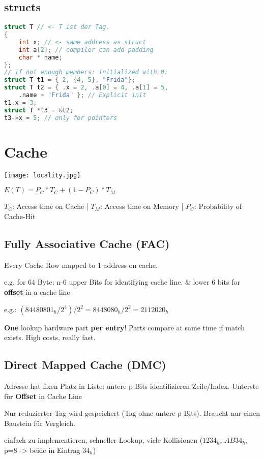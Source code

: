 \begin{multicols*}{4}
\subsection{structs}
\begin{lstlisting}[language=c]
struct T // <- T ist der Tag.
{
    int x; // <- same address as struct
    int a[2]; // compiler can add padding
    char * name;
};
// If not enough members: Initialized with 0:
struct T t1 = { 2, {4, 5}, "Frida"};
struct T t2 = { .x = 2, .a[0] = 4, .a[1] = 5,
    .name = "Frida" }; // Explicit init
t1.x = 3;
struct T *t3 = &t2;
t3->x = 5; // only for pointers
\end{lstlisting}

\section{Cache}
\texttt{[image: locality.jpg]}

\(E(T) = P_C * T_C + (1 - P_C )* T_M\)

\(T_C\): Access time on Cache |
\(T_M\): Access time on Memory |
\(P_C\): Probability of Cache-Hit

\subsection{Fully Associative Cache (FAC)}
Every Cache Row mapped to 1 address on cache.

e.g. for 64 Byte: n-6 upper Bits for identifying cache line. \& lower 6 bits for \textbf{offset} in a cache line

e.g.: \((84480801_h / 2^4) / 2^2 = 8448080_h / 2^2 = 2112020_h\)

\textbf{One} lookup hardware part \textbf{per entry}! Parts compare at same time if match exists. High costs, really fast.

\subsection{Direct Mapped Cache (DMC)}

Adresse hat fixen Platz in Liste: untere p Bits identifizieren Zeile/Index. Unterste für \textbf{Offset} in Cache Line

Nur reduzierter Tag wird gespeichert (Tag ohne untere p Bits). Braucht nur einen Baustein für Vergleich.

einfach zu implementieren, schneller Lookup, viele Kollisionen (\(1234_h\), \(AB34_h\), p=8 -> beide in Eintrag \(34_h\))


\end{multicols*}
